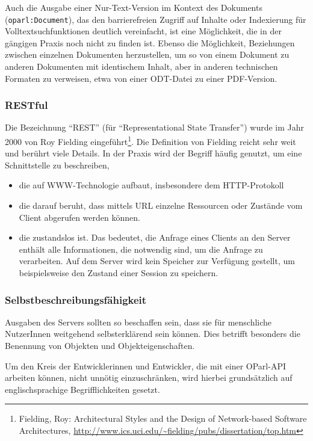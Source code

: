 \documentclass[,a4paper]{article}
\begin{document}
Auch die Ausgabe einer Nur-Text-Version im Kontext des Dokuments
(\texttt{oparl:Document}), das den barrierefreien Zugriff auf Inhalte
oder Indexierung für Volltextsuchfunktionen deutlich vereinfacht, ist
eine Möglichkeit, die in der gängigen Praxis noch nicht zu finden ist.
Ebenso die Möglichkeit, Beziehungen zwischen einzelnen Dokumenten
herzustellen, um so von einem Dokument zu anderen Dokumenten mit
identischem Inhalt, aber in anderen technischen Formaten zu verweisen,
etwa von einer ODT-Datei zu einer PDF-Version.

\subsubsection{RESTful}\label{restful}

Die Bezeichnung ``REST'' (für ``Representational State Transfer'') wurde
im Jahr 2000 von Roy Fielding eingeführt\footnote{Fielding, Roy:
  Architectural Styles and the Design of Network-based Software
  Architectures,
  \url{http://www.ics.uci.edu/~fielding/pubs/dissertation/top.htm}}. Die
Definition von Fielding reicht sehr weit und berührt viele Details. In
der Praxis wird der Begriff häufig genutzt, um eine Schnittstelle zu
beschreiben,

\begin{itemize}
\itemsep1pt\parskip0pt
\item
  die auf WWW-Technologie aufbaut, insbesondere dem HTTP-Protokoll
\item
  die darauf beruht, dass mittels URL einzelne Ressourcen oder Zustände
  vom Client abgerufen werden können.
\item
  die zustandslos ist. Das bedeutet, die Anfrage eines Clients an den
  Server enthält alle Informationen, die notwendig sind, um die Anfrage
  zu verarbeiten. Auf dem Server wird kein Speicher zur Verfügung
  gestellt, um beispielsweise den Zustand einer Session zu speichern.
\end{itemize}

\subsubsection{Selbstbeschreibungsfähigkeit}\label{selbstbeschreibungsfuxe4higkeit}

Ausgaben des Servers sollten so beschaffen sein, dass sie für
menschliche NutzerInnen weitgehend selbsterklärend sein können. Dies
betrifft besonders die Benennung von Objekten und Objekteigenschaften.

Um den Kreis der Entwicklerinnen und Entwickler, die mit einer OParl-API
arbeiten können, nicht unnötig einzuschränken, wird hierbei
grundsätzlich auf englischsprachige Begrifflichkeiten gesetzt.
\end{document}
